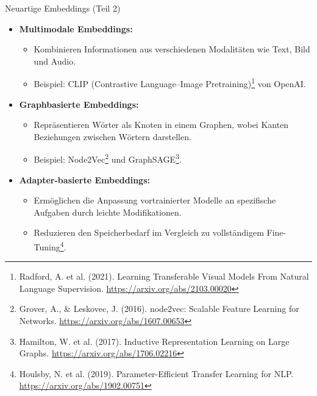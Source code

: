 \documentclass[aspectratio=1610, xcolor=dvipsnames, 9pt]{beamer}
\begin{document}
\begin{frame}{Neuartige Embeddings (Teil 2)}
  \begin{itemize}
    \item \textbf{Multimodale Embeddings:}
      \begin{itemize}
        \item Kombinieren Informationen aus verschiedenen Modalitäten wie Text, Bild und Audio.
        \item Beispiel: CLIP (Contrastive Language–Image Pretraining)\footnote{Radford, A. et al. (2021). Learning Transferable Visual Models From Natural Language Supervision. \url{https://arxiv.org/abs/2103.00020}} von OpenAI.
      \end{itemize}
    \vspace{0.5cm}
    \item \textbf{Graphbasierte Embeddings:}
      \begin{itemize}
        \item Repräsentieren Wörter als Knoten in einem Graphen, wobei Kanten Beziehungen zwischen Wörtern darstellen.
        \item Beispiel: Node2Vec\footnote{Grover, A., \& Leskovec, J. (2016). node2vec: Scalable Feature Learning for Networks. \url{https://arxiv.org/abs/1607.00653}} und GraphSAGE\footnote{Hamilton, W. et al. (2017). Inductive Representation Learning on Large Graphs. \url{https://arxiv.org/abs/1706.02216}}.
      \end{itemize}
    \vspace{0.5cm}
    \item \textbf{Adapter-basierte Embeddings:}
      \begin{itemize}
        \item Ermöglichen die Anpassung vortrainierter Modelle an spezifische Aufgaben durch leichte Modifikationen.
        \item Reduzieren den Speicherbedarf im Vergleich zu vollständigem Fine-Tuning\footnote{Houlsby, N. et al. (2019). Parameter-Efficient Transfer Learning for NLP. \url{https://arxiv.org/abs/1902.00751}}.
      \end{itemize}
  \end{itemize}
\end{frame}
\end{document}
